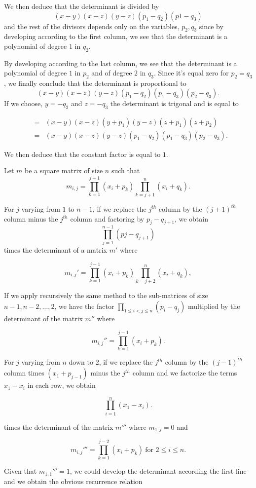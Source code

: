 \documentclass[a4paper,12pt]{article}
\begin{document}
We then deduce that the determinant is divided by
\[(x-y)(x-z)(y-z)(p_1-q_2)(p1-q_3)\]
and the rest of the divisors depends only on the variables, $p_2, q_3$
since by developing according to the first column, we see that the
determinant is a polynomial of degree $1$ in $q_2$.

By developing according to the last column, we see that the
determinant is a polynomial of degree $1$ in $p_2$ and of degree $2$
in $q_3$.  Since it's equal zero for $p_2 = q_3$, we finally conclude
that the determinant is proportional to
\[(x-y)(x-z)(y-z)(p_1-q_2)(p_1-q_3)(p_2-q_3).\]
If we choose, $y = -q_2$ and $z = -q_3$ the determinant is trigonal and
is equal to

\begin{eqnarray*}
  &=& (x-y)(x-z)(y+p_1)(y-z)(z+p_1)(z+p_2) \\
  &=& (x-y)(x-z)(y-z)(p_1-q_2)(p_1-q_3)(p_2-q_3).
\end{eqnarray*}

We then deduce that the constant factor is equal to $1$.

\medskip
Let $m$ be a square matrix of size $n$ such that
\[ m_{i,j} = \prod_{k=1}^{j-1}(x_i + p_k) \prod_{k=j+1}^n(x_i +
q_k).\]

For $j$ varying from $1$ to $n-1$, if we replace the $j^{th}$ column
by the $(j+1)^{th}$ column minus the $j^{th}$ column and factoring by
$p_j  - q_{j+1}$, we obtain \[\prod_{j=1}^{n-1}(pj-q_{j+1})\] times
the determinant of a matrix $m'$ where

\[m_{i,j}' = \prod_{k=1}^{j-1}(x_i+p_k) \prod_{k=j+2}^n(x_i+q_k),\]

If we apply recursively the same method to the sub-matrices of size
$n-1, n-2, \ldots, 2$, we have the factor $\prod_{1\le i<j\le
  n}(p_i-q_j)$ multiplied by the determinant of the matrix $m''$ where

\[ m_{i,j}'' = \prod_{k=1}^{j-1}(x_i + p_k).\]

For $j$ varying from $n$ down to $2$, if we replace the $j^{th}$
column by the $(j-1)^{th}$ column times $(x_1+p_{j-1})$ minus the
$j^{th}$ column and we factorize the terms $x_1 - x_i$ in each row, we
obtain

\[ \prod_{i=1}^n (x_1 - x_i).\]

times the determinant of the matrix $m'''$ where $m_{1,j} = 0$ and

\[ m_{i,j}''' = \prod_{k=1}^{j-2}(x_i + p_k)\ \mbox{for $2\le i\le
  n$}.\]

Given that $m_{1,1}''' = 1$,  we could develop the determinant
according the first line and we obtain the obvious recurrence relation
\end{document}
